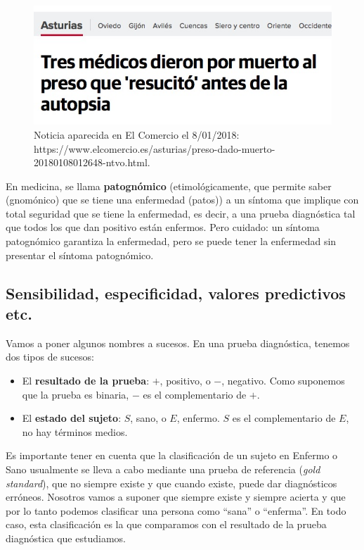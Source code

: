 \documentclass[
]{book}
\theoremstyle{definition}
\theoremstyle{definition}
\theoremstyle{definition}
\theoremstyle{definition}
\theoremstyle{remark}
\begin{document}
\begin{figure}

{\centering \includegraphics[width=0.6\linewidth]{INREMDN_files/figure-html/lazaro1} 

}

\caption{Noticia aparecida en  El Comercio el 8/01/2018: https://www.elcomercio.es/asturias/preso-dado-muerto-20180108012648-ntvo.html.}\label{fig:elcomercio}
\end{figure}

\begin{rmdnote}
En medicina, se llama \textbf{patognómico} (etimológicamente, que permite saber (gnomónico) que se tiene una enfermedad (patos)) a un síntoma que implique con total seguridad que se tiene la enfermedad, es decir, a una prueba diagnóstica tal que todos los que dan positivo están enfermos. Pero cuidado: un síntoma patognómico garantiza la enfermedad, pero se puede tener la enfermedad sin presentar el síntoma patognómico.
\end{rmdnote}

\hypertarget{sensibilidad-especificidad-valores-predictivos-etc.}{%
\subsection{Sensibilidad, especificidad, valores predictivos etc.}\label{sensibilidad-especificidad-valores-predictivos-etc.}}

Vamos a poner algunos nombres a sucesos. En una prueba diagnóstica, tenemos dos tipos de sucesos:

\begin{itemize}
\item
  El \textbf{resultado de la prueba}: \(+\), positivo, o \(-\), negativo. Como suponemos que la prueba es binaria, \(-\) es el complementario de \(+\).
\item
  El \textbf{estado del sujeto}: \(S\), sano, o \(E\), enfermo. \(S\) es el complementario de \(E\), no hay términos medios.
\end{itemize}

\begin{rmdnote}
Es importante tener en cuenta que la clasificación de un sujeto en Enfermo o Sano usualmente se lleva a cabo mediante una prueba de referencia (\emph{gold standard}), que no siempre existe y que cuando existe, puede dar diagnósticos erróneos. Nosotros vamos a suponer que siempre existe y siempre acierta y que por lo tanto podemos clasificar una persona como ``sana'' o ``enferma''. En todo caso, esta clasificación es la que comparamos con el resultado de la prueba diagnóstica que estudiamos.
\end{rmdnote}
\end{document}
